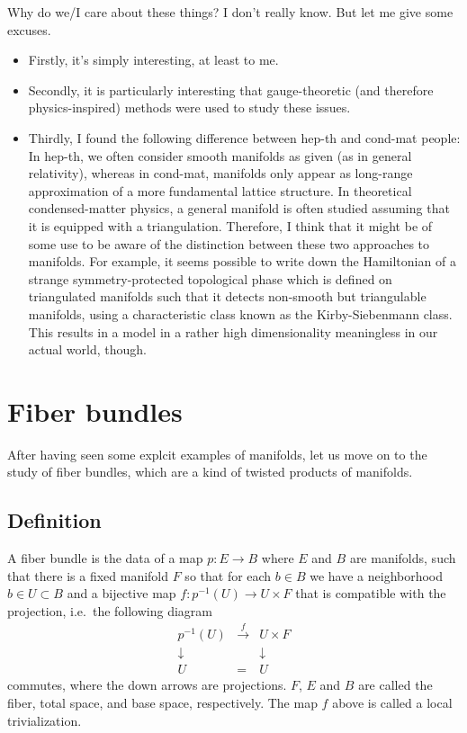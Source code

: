 \documentclass[12pt]{article}
\numberwithin{equation}{section}
\numberwithin{figure}{section}
\theoremstyle{remark}
\begin{document}
Why do we/I care about these things?
I don't really know.  But let me give some excuses.
\begin{itemize}
  \item Firstly, it's simply interesting, at least to me.
\item Secondly, it is particularly interesting that gauge-theoretic (and therefore physics-inspired)
methods were used to study these issues.
\item Thirdly, I found the following difference between hep-th and cond-mat people:
In hep-th, we often consider smooth manifolds as given (as in general relativity),
whereas in cond-mat, manifolds only appear as long-range approximation of a more fundamental
lattice structure. 
In theoretical condensed-matter physics, a general manifold is often studied
assuming that it is equipped with a triangulation. 
Therefore, I think that it might be of some use to be aware of the distinction between
these two approaches to manifolds.
For example, it seems possible to write down
the Hamiltonian of a strange symmetry-protected topological phase
which is defined on triangulated manifolds such that
it detects non-smooth but triangulable manifolds, 
using a characteristic class known as the Kirby-Siebenmann class.
This results in a model in a rather high dimensionality meaningless in our actual world, though.
\end{itemize}

\section{Fiber bundles}

After having seen some explcit examples of manifolds,
let us move on to the study of fiber bundles,
which are a kind of twisted products of manifolds.

\subsection{Definition}

\begin{definition}
A fiber bundle is the data of a map $p: E\to B$
where $E$ and $B$ are manifolds,
such that there is a fixed manifold $F$ so that
for each $b\in B$ we have a neighborhood $b\in U\subset B$ 
and a bijective map $f: p^{-1}(U)\to U\times F$
that is compatible with the projection, i.e.~the following diagram \begin{equation}
  \begin{array}{ccc}
    p^{-1}(U) & \xrightarrow{f} & U\times F \\
    \downarrow & & \downarrow \\
    U & = & U
  \end{array}
\end{equation}
commutes, where the down arrows are projections.
$F$, $E$ and $B$ are called the fiber, total space, and base space, respectively.
The map $f$ above is called a local trivialization.
\end{definition}
\end{document}
